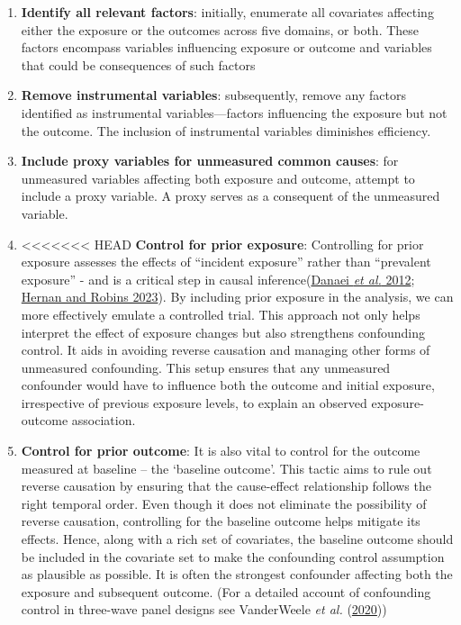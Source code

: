 \documentclass[
  singlecolumn,
  9pt]{article}
\begin{document}
\begin{enumerate}
\def\labelenumi{\arabic{enumi}.}
\item
  \textbf{Identify all relevant factors}: initially, enumerate all
  covariates affecting either the exposure or the outcomes across five
  domains, or both. These factors encompass variables influencing
  exposure or outcome and variables that could be consequences of such
  factors
\item
  \textbf{Remove instrumental variables}: subsequently, remove any
  factors identified as instrumental variables---factors influencing the
  exposure but not the outcome. The inclusion of instrumental variables
  diminishes efficiency.
\item
  \textbf{Include proxy variables for unmeasured common causes}: for
  unmeasured variables affecting both exposure and outcome, attempt to
  include a proxy variable. A proxy serves as a consequent of the
  unmeasured variable.
\item
<<<<<<< HEAD
  \textbf{Control for prior exposure}: Controlling for prior exposure
  assesses the effects of ``incident exposure'' rather than ``prevalent
  exposure'' - and is a critical step in causal
  inference(\hyperref[ref-danaei2012]{Danaei \emph{et al.} 2012};
  \hyperref[ref-hernan2023]{Hernan and Robins 2023}). By including prior
  exposure in the analysis, we can more effectively emulate a controlled
  trial. This approach not only helps interpret the effect of exposure
  changes but also strengthens confounding control. It aids in avoiding
  reverse causation and managing other forms of unmeasured confounding.
  This setup ensures that any unmeasured confounder would have to
  influence both the outcome and initial exposure, irrespective of
  previous exposure levels, to explain an observed exposure-outcome
  association.
\item
  \textbf{Control for prior outcome}: It is also vital to control for
  the outcome measured at baseline -- the `baseline outcome'. This
  tactic aims to rule out reverse causation by ensuring that the
  cause-effect relationship follows the right temporal order. Even
  though it does not eliminate the possibility of reverse causation,
  controlling for the baseline outcome helps mitigate its effects.
  Hence, along with a rich set of covariates, the baseline outcome
  should be included in the covariate set to make the confounding
  control assumption as plausible as possible. It is often the strongest
  confounder affecting both the exposure and subsequent outcome. (For a
  detailed account of confounding control in three-wave panel designs
  see VanderWeele \emph{et al.} (\hyperref[ref-vanderweele2020]{2020}))
\end{enumerate}
\end{document}
